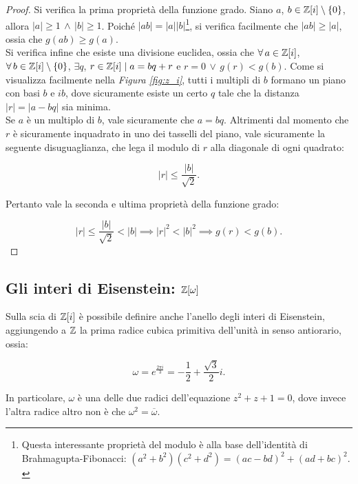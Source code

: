 \begin{proof}
    Si verifica la prima proprietà della funzione grado. Siano $a$, $b \in \mathbb Z[i] \setminus \{0\}$,
    allora $\left|a\right| \geq 1 \,\land\, \left|b\right| \geq 1$. Poiché
    $\left|ab\right| = \left|a\right|\left|b\right|$\footnote{Questa interessante proprietà del modulo è alla base dell'identità di Brahmagupta-Fibonacci: $(a^2 + b^2)(c^2 + d^2) = (ac-bd)^2 + (ad+bc)^2.$}, si verifica facilmente che
    $\left|ab\right| \geq \left|a\right|$, ossia che $g(ab) \geq g(a)$. \\

    Si verifica infine che esiste una divisione euclidea, ossia che
    $\forall a \in \ZZ[i]$, $\forall b \in \ZZ[i] \setminus \{0\}$, $\exists q$, $r \in \mathbb Z[i] \mid a = bq + r$ e $r=0 \,\lor\, g(r) < g(b)$.
    Come si visualizza facilmente nella \textit{Figura \ref{fig:z_i}},
    tutti i multipli di $b$ formano un piano con basi $b$ e $ib$, dove
    sicuramente esiste un certo $q$ tale che la distanza $\left|r\right| = \left|a-bq\right|$ sia minima. \\

    Se $a$ è un multiplo di $b$, vale sicuramente che $a = bq$. Altrimenti dal momento che $r$ è sicuramente inquadrato in uno dei tasselli del piano, vale
    sicuramente la seguente disuguaglianza, che lega il modulo di $r$ alla diagonale di
    ogni quadrato:

    \[\left|r\right| \leq \frac{\left|b\right|}{\sqrt{2}}.\]

    Pertanto vale la seconda e ultima proprietà della funzione grado:

    \[\left|r\right| \leq \frac{\left|b\right|}{\sqrt{2}} < \left|b\right| \implies \left|r\right|^2 < \left|b\right|^2 \implies g(r) < g(b).\]
\end{proof}

\subsection{Gli interi di Eisenstein: $\mathbb Z[\omega]$}

Sulla scia di $\mathbb Z[i]$ è possibile definire anche l'anello degli
interi di Eisenstein, aggiungendo a $\mathbb Z$ la prima radice cubica
primitiva dell'unità in senso antiorario, ossia:

\[\omega = e^{\frac{2\pi i}{3}} = -\frac{1}{2} + \frac{\sqrt{3}}{2}i.\]

In particolare, $\omega$ è una delle due radici dell'equazione
$z^2 + z + 1 = 0$, dove invece l'altra radice altro non è che
$\omega^2 = \overline{\omega}$.

